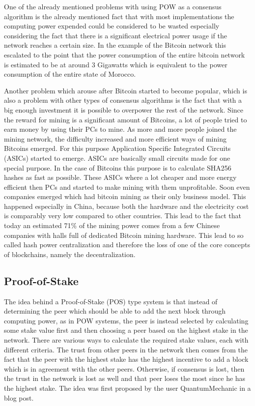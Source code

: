 One of the already mentioned problems with using POW as a consensus algorithm is the already mentioned fact that with most implementations the computing power expended could be considered to be wasted
especially considering the fact that there is a significant electrical power usage if the network reaches a certain size. In the example of the Bitcoin network this escalated to the point that the
power consumption of the entire bitcoin network is estimated to be at around 3 Gigawatts which is equivalent to the power consumption of the entire state of Morocco.\cite{url:btc_power}

Another problem which arouse after Bitcoin started to become popular, which is also a problem with other types of consensus algorithms is the fact that with a big enough investment it is possible to
overpower the rest of the network. Since the reward for mining is a significant amount of Bitcoins, a lot of people tried to earn money by using their PCs to mine. As more and more people joined the
mining network, the difficulty increased and more efficient ways of mining Bitcoins emerged. For this purpose Application Specific Integrated Circuits (ASICs) started to emerge. ASICs are basically
small circuits made for one special purpose. In the case of Bitcoins this purpose is to calculate SHA256 hashes as fast as possible.\cite{url:asic} These ASICs where a lot cheaper and more energy
efficient then PCs and started to make mining with them unprofitable. Soon even companies emerged which had bitcoin mining as their only business model. This happened especially in China, because both
the hardware and the electricity cost is comparably very low compared to other countries. This lead to the fact that today an estimated 71\% of the mining power comes from a few Chinese companies with
halls full of dedicated Bitcoin mining hardware. This lead to so called hash power centralization and therefore the loss of one of the core concepts of blockchains, namely the
decentralization.\cite{url:btc_china}

\subsection{Proof-of-Stake}

The idea behind a Proof-of-Stake (POS) type system is that instead of determining the peer which should be able to add the next block through computing power, as in POW systems, the peer is instead
selected by calculating some stake value first and then choosing a peer based on the highest stake in the network. There are various ways to calculate the required stake values, each with different
criteria. The trust from other peers in the network then comes from the fact that the peer with the highest stake has the highest incentive to add a block which is in agreement with the other peers.
Otherwise, if consensus is lost, then the trust in the network is lost as well and that peer loses the most since he has the highest stake. The idea was first proposed by the user QuantumMechanic in a
blog post.\cite{url:pos}

